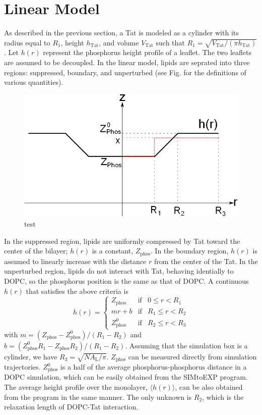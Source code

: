 \documentclass[12pt,letterpaper]{article}
\newcommand{\zphos}{Z_\mathrm{phos}}
\newcommand{\vtat}{V_\mathrm{Tat}}
\newcommand{\htat}{h_\mathrm{Tat}}
\newcommand{\al}{A_\mathrm{L}}
\begin{document}
\section{Linear Model}
As described in the previous section, a Tat is modeled as a cylinder with 
its radius equal to $R_1$, height $\htat$,
and volume $\vtat$ such that $R_1=\sqrt{\vtat/(\pi \htat)}$. 
Let $h(r)$ represent the phosphorus height profile
of a leaflet. The two leaflets are assumed to be decoupled.
In the linear model, lipids are seprated into three regions: 
suppressed, boundary, and unperturbed (see Fig. for the definitions
of various quantities). 
\begin{figure}
  \centering
  \includegraphics[scale=0.5]{./figures/linear_model.png}
  \caption{test}
  \label{fig:linear_model}
\end{figure}
In the suppressed region,
lipids are uniformly compressed by Tat toward the center of the bilayer; 
$h(r)$ is a constant, $\zphos$. In the boundary region, $h(r)$ is assumed to 
linearly increase with the distance $r$ from the center of the Tat. In
the unperturbed region, lipids do not interact with Tat, behaving
identially to DOPC, so the phosphorus position is the same as that of 
DOPC. A continuous $h(r)$ that 
satisfies the above criteria is
\begin{equation}
  h(r) = \left\{ 
  \begin{array}{lcr}
    \zphos   & \text{if} & 0   \leq r < R_1 \\
    mr+b     & \text{if} & R_1 \leq r < R_2 \\
    \zphos^0 & \text{if} & R_2 \leq r < R_3 
  \end{array}\right.  
\end{equation}     
with $m=(\zphos-\zphos^0)/(R_1-R_2)$ and $b=(\zphos^0R_1-\zphos R_2)/(R_1-R_2)$. 
Assuming that the simulation box is a cylinder, we have 
$R_3=\sqrt{N\al/\pi}$. $\zphos$ can be measured directly from simulation trajectories.
$\zphos^0$ is a half of the average phosphorus-phosphorus distance in a DOPC simulation,
which can be easily obtained from the SIMtoEXP program. The average height profile over
the monolayer, $\langle h(r) \rangle$, can be also obtained from the program in the same manner. 
The only unknown is $R_2$, which is the relaxation length of DOPC-Tat interaction.
\end{document}
